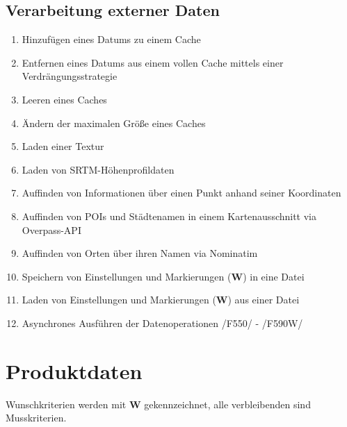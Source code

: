 \documentclass[10pt]{scrreprt}
\newcommand{\sfbf}[1]{\textbf{\sffamily #1}}
\newcommand{\W}{\sfbf{W}}
\newcommand{\ziel}[1]{{\fontsize{9.5}{11}\textsf{/#1/}}}
\newcommand{\ziellabel}{Z}
\newcommand{\muss}{\renewcommand{\labelenumi}{\textbf{\ziel{\ziellabel\numprint{\theenumi}0}}}}
\newcommand{\wunsch}{\renewcommand{\labelenumi}{\textbf{\ziel{\ziellabel\numprint{\theenumi}0W}}}}
\begin{document}
\section{Verarbeitung externer Daten}
\begin{enumerate}[resume,leftmargin=2.2cm]
\item Hinzufügen eines Datums zu einem Cache
\item Entfernen eines Datums aus einem vollen Cache mittels einer Verdrängungsstrategie
\item Leeren eines Caches
\item Ändern der maximalen Größe eines Caches
\item Laden einer Textur
\wunsch
\item Laden von SRTM-Höhenprofildaten
\item Auffinden von Informationen über einen Punkt anhand seiner Koordinaten
\muss
\item Auffinden von POIs und Städtenamen in einem Kartenausschnitt via Overpass-API
\wunsch
\item Auffinden von Orten über ihren Namen via Nominatim
\muss
\item Speichern von Einstellungen und Markierungen (\W) in eine Datei
\item Laden von Einstellungen und Markierungen (\W) aus einer Datei
\item Asynchrones Ausführen der Datenoperationen \ziel{F550} - \ziel{F590W}
\end{enumerate}


\chapter{Produktdaten}

\renewcommand{\ziellabel}{D}
\muss

Wunschkriterien werden mit {\W } gekennzeichnet, alle verbleibenden sind Musskriterien.\\
\end{document}
